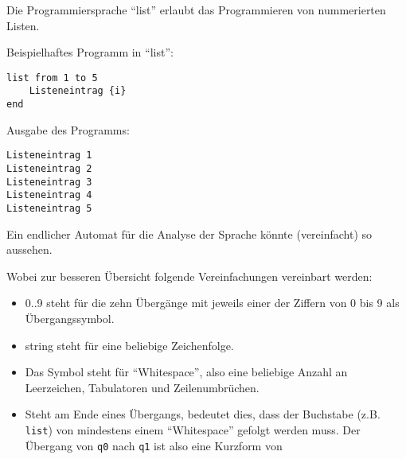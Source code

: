 \documentclass[fontsize=10pt, a4paper, ngerman]{scrartcl}
\begin{document}
\ReiheTitel

\begin{aufgabe}[subtitle=list 1.0]
	\label{aufg:list-v1}
	Die Programmiersprache \enquote{list} erlaubt das Programmieren von
	nummerierten Listen.

	\begin{minipage}[t]{.5\textwidth}
	Beispielhaftes Programm in \enquote{list}:
	\begin{verbatim}
list from 1 to 5
    Listeneintrag {i}
end
	\end{verbatim}
	\end{minipage}\hfill\begin{minipage}[t]{.5\textwidth}
	Ausgabe des Programms:
	\begin{verbatim}
Listeneintrag 1
Listeneintrag 2
Listeneintrag 3
Listeneintrag 4
Listeneintrag 5
	\end{verbatim}
	\end{minipage}

	Ein endlicher Automat für die Analyse der Sprache könnte (vereinfacht) so aussehen.

	\begin{center}
		\rmfamily\small
		\begin{transitiongraph}[fa]

		\end{transitiongraph}
	\end{center}

	Wobei zur besseren Übersicht folgende Vereinfachungen vereinbart werden:
	\begin{itemize}
		\item {\rmfamily\small 0..9} steht für die zehn Übergänge mit jeweils einer der Ziffern von 0 bis
			9 als Übergangssymbol.
		\item {\rmfamily\small string} steht für eine beliebige Zeichenfolge.
		\item Das Symbol {\rmfamily\textvisiblespace} steht für \enquote{Whitespace}, also eine
			beliebige Anzahl an Leerzeichen, Tabulatoren und Zeilenumbrüchen.
		\item Steht {\rmfamily\textvisiblespace} am Ende eines Übergangs, bedeutet dies, dass der
			Buchstabe (z.B. \texttt{list}) von mindestens einem \enquote{Whitespace} gefolgt werden
			muss. Der Übergang von \texttt{q0} nach \texttt{q1} ist also eine Kurzform von



\end{itemize}
\end{aufgabe}
\end{document}
